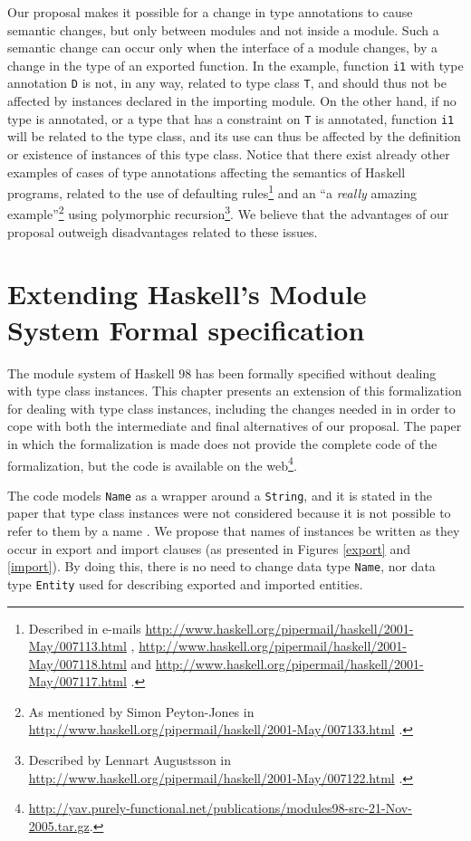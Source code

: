 \documentclass[msc]{ppgccufmg}
\begin{document}
Our proposal makes it possible for a change in type annotations to
cause semantic changes, but only between modules and not inside a
module. Such a semantic change can occur only when the interface of a
module changes, by a change in the type of an exported function. In
the example, function \texttt{i1} with type annotation \texttt{D} is
not, in any way, related to type class \texttt{T}, and should thus not
be affected by instances declared in the importing module.  On the
other hand, if no type is annotated, or a type that has a constraint
on \texttt{T} is annotated, function \texttt{i1} will be related to the
type class, and its use can thus be affected by the definition or
existence of instances of this type class.  Notice that there exist
already other examples of cases of type annotations affecting the
semantics of Haskell programs, related to the use of defaulting
rules\footnote{Described in e-mails
  \url{http://www.haskell.org/pipermail/haskell/2001-May/007113.html}
  ,
  \url{http://www.haskell.org/pipermail/haskell/2001-May/007118.html}
  and
  \url{http://www.haskell.org/pipermail/haskell/2001-May/007117.html}
  .} and an ``a \textit{really\/} amazing example''\footnote{As
  mentioned by Simon Peyton-Jones in
  \url{http://www.haskell.org/pipermail/haskell/2001-May/007133.html}
  .} using polymorphic recursion\footnote{Described by Lennart
  Augustsson in
  \url{http://www.haskell.org/pipermail/haskell/2001-May/007122.html}
  .}.  We believe that the advantages of our proposal outweigh
disadvantages related to these issues.

\chapter[Extending the Module System specification]{Extending Haskell's Module System Formal specification}
The module system of Haskell 98 has been formally specified
\citep{formal} without dealing with type class instances. This chapter
presents an extension of this formalization for dealing with type
class instances, including the changes needed in \citep{formal} in
order to cope with both the intermediate and final alternatives of our
proposal.  The paper in which the formalization is made does not
provide the complete code of the formalization, but the code is
available on the
web\footnote{\url{http://yav.purely-functional.net/publications/modules98-src-21-Nov-2005.tar.gz}.}.

The code models \texttt{Name} as a wrapper around a \texttt{String},
and it is stated in the paper that type class instances were not
considered because it is not possible to refer to them by a
name \citep[section~3.1]{formal}. We propose that names of instances be
written as they occur in export and import clauses (as presented in
Figures \ref{export} and \ref{import}).  By doing this, there is no
need to change data type \texttt{Name}, nor data type \texttt{Entity}
used for describing exported and imported entities.
\end{document}
